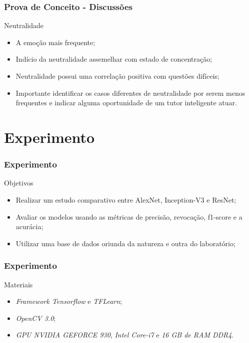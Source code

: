 \documentclass{beamer}
\begin{document}
\begin{frame}
\frametitle{Prova de Conceito - Discussões}
\begin{block}{Neutralidade}
\begin{itemize}
\item A emo\c{c}\~ao mais frequente;
\item Ind\'{i}cio da neutralidade assemelhar com estado de concentra\c{c}\~ao;
\item Neutralidade possui uma correla\c{c}\~ao positiva com quest\~oes dif\'{i}ceis;
\pause
\item Importante identificar os casos diferentes de neutralidade por serem menos frequentes 
e indicar alguma oportunidade de um tutor inteligente atuar.
\end{itemize}
\end{block}

\end{frame}
 
 

\section{Experimento}

\begin{frame}
 \frametitle{Experimento}
\begin{block}{Objetivos}
\begin{itemize}
\pause
\item Realizar um estudo comparativo entre AlexNet, Inception-V3 e ResNet;
\pause
\item Avaliar os modelos usando as métricas de precisão, revocação, f1-score e a acurácia;
\pause
\item Utilizar uma base de dados oriunda da natureza e outra do laboratório;
\end{itemize}
\end{block} 
\end{frame}


\begin{frame}
 \frametitle{Experimento}
\begin{block}{Materiais}
\begin{itemize}
\pause
\item \textit{Framework Tensorflow} e \textit{TFLearn};
\pause
\item \textit{OpenCV 3.0};
\pause
\item \textit{GPU NVIDIA GEFORCE 930}, \textit{Intel Core-i7} e \textit{16 GB de RAM DDR4}.

\end{itemize}
\end{block} 
\end{frame}
\end{document}
